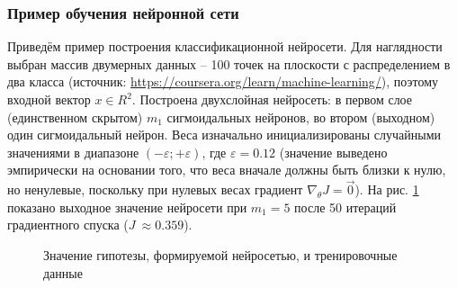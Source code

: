 \documentclass[../body.tex]{subfiles}
\begin{document}
\subsubsection{Пример обучения нейронной сети}
Приведём пример построения классификационной нейросети. Для наглядности выбран массив двумерных данных – 100 точек на плоскости с распределением в два класса (источник: \url{https://coursera.org/learn/machine-learning/}), поэтому входной вектор $x\in R^2$.  Построена двухслойная нейросеть: в первом слое (единственном скрытом) $m_1$ сигмоидальных нейронов, во втором (выходном) один сигмоидальный нейрон. Веса изначально инициализированы случайными значениями в диапазоне $(-\varepsilon;+\varepsilon)$, где $\varepsilon=0.12$ (значение выведено эмпирически на основании того, что веса вначале должны быть близки к нулю, но ненулевые, поскольку при нулевых весах градиент $\nabla_\theta J=\vec{0}$). На рис. \ref{nnetBoundary}  показано выходное значение нейросети при $m_1=5$ после 50 итераций градиентного спуска ($J\ \approx0.359$).
\begin{figure}[H]
	\caption{Значение гипотезы, формируемой нейросетью, и тренировочные данные}
	\label{nnetBoundary}
\end{figure}
\end{document}
